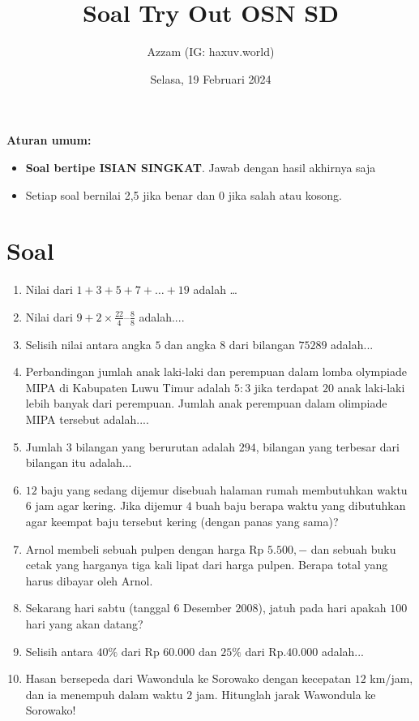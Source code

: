 \documentclass[11pt]{scrartcl}
\title{Soal Try Out OSN SD}
\author{Azzam (IG: haxuv.world)}
\date{Selasa, 19 Februari 2024}
\begin{document}
\maketitle
\textbf{Aturan umum:}
\begin{itemize}
    \item \textbf{Soal bertipe ISIAN SINGKAT}. Jawab dengan hasil akhirnya saja
    \item Setiap soal bernilai 2,5 jika benar dan 0 jika salah atau kosong.
\end{itemize}

\section{Soal}
\begin{enumerate}
\item Nilai dari $1+3+5+7+\ldots+19$ adalah \dots
\item Nilai dari $9 + 2 \times \frac{22}{4} – \frac{8}{8}$ adalah....
\item Selisih nilai antara angka $5$ dan angka $8$ dari bilangan $75289$ adalah...
\item Perbandingan jumlah anak laki-laki dan perempuan dalam lomba olympiade MIPA di Kabupaten Luwu Timur adalah $5:3$ jika terdapat $20$ anak laki-laki lebih banyak dari perempuan. Jumlah anak perempuan dalam olimpiade MIPA tersebut adalah....
\item Jumlah $3$ bilangan yang berurutan adalah $294$, bilangan yang terbesar dari bilangan itu adalah...
\item $12$ baju yang sedang dijemur disebuah halaman rumah membutuhkan waktu $6$ jam agar kering. Jika dijemur $4$ buah baju berapa waktu yang dibutuhkan agar keempat baju tersebut kering (dengan panas yang sama)?
\item Arnol membeli sebuah pulpen dengan harga Rp $5.500,-$ dan sebuah buku cetak yang harganya tiga kali lipat dari harga pulpen. Berapa total yang harus dibayar oleh Arnol.
\item Sekarang hari sabtu (tanggal $6$ Desember $2008$), jatuh pada hari apakah $100$ hari yang akan datang?
\item Selisih antara $40\%$ dari Rp $60.000$ dan $25\%$ dari Rp.$40.000$ adalah...

\item Hasan bersepeda dari Wawondula ke Sorowako dengan kecepatan $12$ km/jam, dan ia menempuh dalam waktu $2$ jam. Hitunglah jarak Wawondula ke Sorowako!


\end{enumerate}
\end{document}
